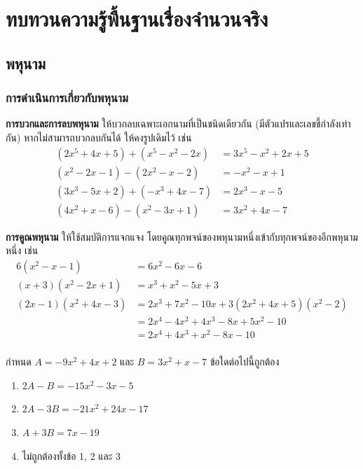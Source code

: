 \chapter{ทบทวนความรู้พื้นฐานเรื่องจำนวนจริง}
\section{พหุนาม}
\subsection{การดำเนินการเกี่ยวกับพหุนาม}
\begin{conceptbox}
\textbf{การบวกและการลบพหุนาม}  
ให้บวกลบเฉพาะเอกนามที่เป็นชนิดเดียวกัน (มีตัวแปรและเลขชี้กำลังเท่ากัน)  
หากไม่สามารถบวกลบกันได้ ให้คงรูปเดิมไว้ เช่น
\begin{align*}
\left(2x^5+4x+5\right)+\left(x^5-x^2-2x\right)
&=3x^5-x^2+2x+5\\
\left(x^2-2x-1\right)-\left(2x^2-x-2\right)
&=-x^2-x+1\\
\left(3x^3-5x+2\right)+\left(-x^3+4x-7\right)
&=2x^3-x-5\\
\left(4x^2+x-6\right)-\left(x^2-3x+1\right)
&=3x^2+4x-7
\end{align*}
\end{conceptbox}

\begin{conceptbox}
\textbf{การคูณพหุนาม}  
ให้ใช้สมบัติการแจกแจง โดยคูณทุกพจน์ของพหุนามหนึ่งเข้ากับทุกพจน์ของอีกพหุนามหนึ่ง เช่น
\begin{align*}
6\left(x^2-x-1\right)
&=6x^2-6x-6\\
\left(x+3\right)\left(x^2-2x+1\right)
&=x^3+x^2-5x+3\\
\left(2x-1\right)\left(x^2+4x-3\right)
&=2x^3+7x^2-10x+3
\left(2x^2+4x+5\right)\left(x^2-2\right)\\
&=2x^4-4x^2+4x^3-8x+5x^2-10\\
&=2x^4+4x^3+x^2-8x-10\\
\end{align*}
\end{conceptbox}

\newpage

\begin{examplebox}
กำหนด $A=-9 x^2+4 x+2$ และ $B=3 x^2+x-7$ ข้อใดต่อไปนี้ถูกต้อง
\begin{enumerate}
\item $2 A-B=-15 x^2-3 x-5$
\item $2 A-3 B=-21 x^2+24 x-17$
\item $A+3 B=7 x-19$
\item ไม่ถูกต้องทั้งข้อ 1, 2 และ 3
\end{enumerate}
\end{examplebox}

